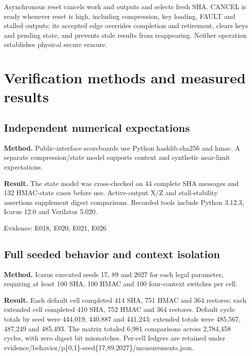 \documentclass[11pt,a4paper]{article}
\begin{document}
Asynchronous reset cancels work and outputs and selects fresh SHA. CANCEL is ready whenever reset is high,\allowbreak{} including compression,\allowbreak{} key loading,\allowbreak{} FAULT and stalled outputs; its accepted edge overrides completion and retirement,\allowbreak{} clears keys and pending state,\allowbreak{} and prevents stale results from reappearing. Neither operation establishes physical secure erasure.

\section{Verification methods and measured results}

\subsection{Independent numerical expectations}

\textbf{Method.} Public-interface scoreboards use Python hashlib.sha256 and hmac. A separate compression/\allowbreak{}state model supports context and synthetic near-limit expectations.

\textbf{Result.} The state model was cross-checked on 44 complete SHA messages and 132 HMAC-state cases before use. Active-output X/\allowbreak{}Z and stall-stability assertions supplement digest comparisons. Recorded tools include Python 3.12.3,\allowbreak{} Icarus 12.0 and Verilator 5.020.

{\small Evidence: E018,\allowbreak{} E020,\allowbreak{} E021,\allowbreak{} E026}

\subsection{Full seeded behavior and context isolation}

\textbf{Method.} Icarus executed seeds 17,\allowbreak{} 89 and 2027 for each legal parameter,\allowbreak{} requiring at least 100 SHA,\allowbreak{} 100 HMAC and 100 four-context switches per cell.

\textbf{Result.} Each default cell completed 414 SHA,\allowbreak{} 751 HMAC and 364 restores; each extended cell completed 410 SHA,\allowbreak{} 752 HMAC and 364 restores. Default cycle totals by seed were 444,\allowbreak{}019,\allowbreak{} 440,\allowbreak{}887 and 441,\allowbreak{}243; extended totals were 485,\allowbreak{}567,\allowbreak{} 487,\allowbreak{}249 and 485,\allowbreak{}493. The matrix totaled 6,\allowbreak{}981 comparisons across 2,\allowbreak{}784,\allowbreak{}458 cycles,\allowbreak{} with zero digest bit mismatches. Per-cell ledgers are retained under evidence/\allowbreak{}behavior/\allowbreak{}p\{0,\allowbreak{}1\}-seed\{17,\allowbreak{}89,\allowbreak{}2027\}/\allowbreak{}measurements.json.
\end{document}
